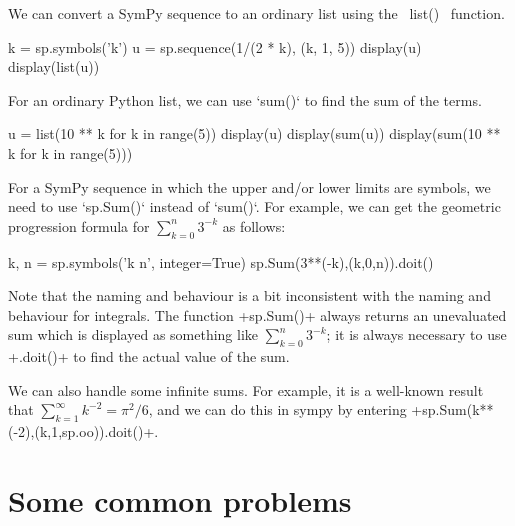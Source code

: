 \documentclass[a4paper,10pt]{amsbook}
\begin{document}
\begin{secenum}
 We can convert a SymPy sequence to an ordinary list using the
 \pcode~list()~ function. 
 \begin{pcodeblock}
    k = sp.symbols('k')
    u = sp.sequence(1/(2 * k), (k, 1, 5))
    display(u)
    display(list(u))
 \end{pcodeblock}
%
 \item\label{sum} 
  For an ordinary Python list, we can use `sum()` to find the sum of the
  terms.
  \begin{pcodeblock}
    u = list(10 ** k for k in range(5))
    display(u)
    display(sum(u))
    display(sum(10 ** k for k in range(5)))   
  \end{pcodeblock}
%
 \item\label{symbolicsum} 
  For a SymPy sequence in which the upper and/or lower limits are
  symbols, we need to use `sp.Sum()` instead of `sum()`.  For example,
  we can get the geometric progression formula for $\sum_{k=0}^n 3^{-k}$
  as follows: 
  \begin{pcodeblock}
   k, n = sp.symbols('k n', integer=True)
   sp.Sum(3**(-k),(k,0,n)).doit()
  \end{pcodeblock}
  Note that the naming and behaviour is a bit inconsistent with the
  naming and behaviour for integrals.  The function \pcode+sp.Sum()+
  always returns an unevaluated sum which is displayed as something
  like $\sum_{k=0}^n3^{-k}$; it is always necessary to use
  \pcode+.doit()+ to find the actual value of the sum.
%
 \item\label{infinitesum} We can also handle some infinite sums.  For
  example, it is a well-known result that
  $\sum_{k=1}^\infty k^{-2}=\pi^2/6$, and we can do this in sympy by
  entering \pcode+sp.Sum(k**(-2),(k,1,sp.oo)).doit()+.
\end{secenum}

\section{Some common problems}\label{sec-problems}
\end{document}
